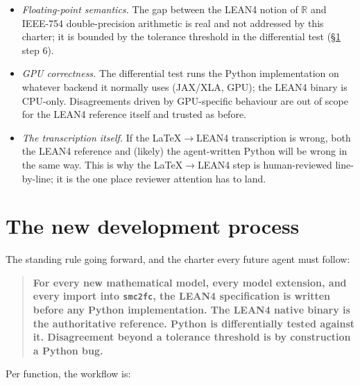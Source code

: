 \documentclass[11pt,a4paper]{article}
\begin{document}
\begin{itemize}
\item \emph{Floating-point semantics.} The gap between the LEAN4
  notion of $\mathbb{R}$ and IEEE-754 double-precision arithmetic
  is real and not addressed by this charter; it is bounded by the
  tolerance threshold in the differential test (§\ref{sec:process}
  step 6).
\item \emph{GPU correctness.} The differential test runs the
  Python implementation on whatever backend it normally uses
  (JAX/XLA, GPU); the LEAN4 binary is CPU-only. Disagreements
  driven by GPU-specific behaviour are out of scope for the LEAN4
  reference itself and trusted as before.
\item \emph{The transcription itself.} If the LaTeX$\to$LEAN4
  transcription is wrong, both the LEAN4 reference and (likely)
  the agent-written Python will be wrong in the same way. This is
  why the LaTeX$\to$LEAN4 step is human-reviewed line-by-line; it
  is the one place reviewer attention has to land.
\end{itemize}

\section{The new development process}
\label{sec:process}

The standing rule going forward, and the charter every future
agent must follow:

\begin{quote}\bfseries
For every new mathematical model, every model extension, and every
import into \texttt{smc2fc}, the LEAN4 specification is written
before any Python implementation. The LEAN4 native binary is the
authoritative reference. Python is differentially tested against
it. Disagreement beyond a tolerance threshold is by construction a
Python bug.
\end{quote}

Per function, the workflow is:
\end{document}
